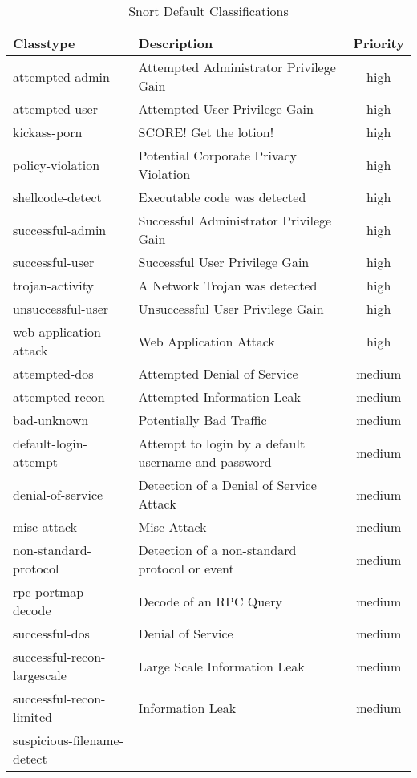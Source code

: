 \documentclass[english]{report}
\begin{document}
\begin{center}
\begin{longtable}{|p{2in}|p{2.5in}|c|}
\caption{Snort Default Classifications \label{Snort Default Classifications}} \\
\hline 
Classtype & Description & Priority \\
\hline
\hline 
attempted-admin&
Attempted Administrator Privilege Gain & high \\
\hline 
attempted-user&
Attempted User Privilege Gain & high\\
\hline
kickass-porn&
SCORE! Get the lotion! & high\\
\hline 
policy-violation&
Potential Corporate Privacy Violation & high\\
\hline
shellcode-detect&
Executable code was detected & high\\
\hline 
successful-admin&
Successful Administrator Privilege Gain & high\\
\hline 
successful-user&
Successful User Privilege Gain & high\\
\hline 
trojan-activity&
A Network Trojan was detected & high\\
\hline 
unsuccessful-user&
Unsuccessful User Privilege Gain & high\\
\hline 
web-application-attack&
Web Application Attack & high\\
\hline
attempted-dos&
Attempted Denial of Service & medium\\
\hline 
attempted-recon&
Attempted Information Leak & medium\\
\hline 
bad-unknown&
Potentially Bad Traffic & medium\\
\hline
default-login-attempt&
Attempt to login by a default username and password & medium\\
\hline 
denial-of-service&
Detection of a Denial of Service Attack & medium\\
\hline 
misc-attack&
Misc Attack & medium\\
\hline 
non-standard-protocol&
Detection of a non-standard protocol or event & medium\\
\hline 
rpc-portmap-decode&
Decode of an RPC Query & medium\\
\hline 
successful-dos&
Denial of Service & medium\\
\hline 
successful-recon-largescale&
Large Scale Information Leak & medium\\
\hline 
successful-recon-limited&
Information Leak & medium\\
\hline 
suspicious-filename-detect&

\end{longtable}
\end{center}
\end{document}
